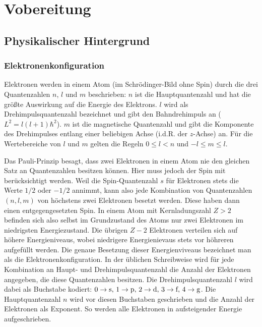 \documentclass{article}
\begin{document}
\newpage

\section{Vobereitung}

\subsection{Physikalischer Hintergrund}

\subsubsection{Elektronenkonfiguration}

Elektronen werden in einem Atom (im Schrödinger-Bild ohne Spin) durch die drei
Quantenzahlen $n$, $l$ und $m$ beschrieben:
$n$ ist die Hauptquantenzahl und hat die größte Auswirkung auf
die Energie des Elektrons. $l$ wird als Drehimpulsquantenzahl bezeichnet und
gibt den Bahndrehimpuls an ($L^2 = l (l + 1) \hbar^2$).
$m$ ist die magnetische Quantenzahl und gibt die Komponente des Drehimpulses
entlang einer beliebigen Achse (i.d.R. der $z$-Achse) an.
Für die Wertebereiche von $l$ und $m$ gelten die Regeln
$0 \leq l < n$ und $-l \leq m \leq l$.

Das Pauli-Prinzip besagt, dass zwei Elektronen in einem Atom nie den gleichen
Satz an Quantenzahlen besitzen können. Hier muss jedoch der Spin mit berücksichtigt
werden. Weil die Spin-Quantenzahl $s$ für Elektronen stets die Werte
$1/2$ oder $-1/2$ annimmt, kann also jede Kombination von Quantenzahlen
$(n, l, m)$ von höchstens zwei Elektronen besetzt werden. Diese haben dann einen
entgegengesetzten Spin. In einem Atom mit Kernladungszahl $Z > 2$
befinden sich also selbst im Grundzustand des Atoms nur zwei Elektronen
im niedrigsten Energiezustand. Die übrigen $Z - 2$ Elektronen verteilen sich
auf höhere Energieniveaus, wobei niedrigere Energienievaus stets vor höhreren
aufgefüllt werden. Die genaue Besetzung dieser Energienviveaus bezeichnet
man als die Elektronenkonfiguration.
In der üblichen Schreibweise wird für jede Kombination an Haupt- und
Drehimpulsquantenzahl die Anzahl der Elektronen angegeben, die diese
Quantenzahlen besitzen. Die Drehimpulsquantenzahl $l$ wird dabei als Buchstabe
kodiert: $0 \to \text s, \, 1 \to \text p, \, 2 \to \text d, \, 3 \to \text f,
\, 4 \to \text g$. Die Hauptquantenzahl $n$ wird vor diesen Buchstaben geschrieben
und die Anzahl der Elektronen als Exponent. So werden alle Elektronen
in aufsteigender Energie aufgeschrieben.
\end{document}
